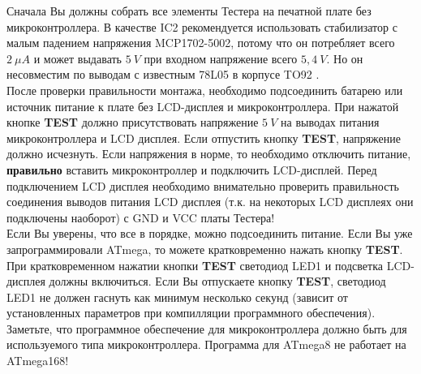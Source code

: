 Сначала Вы должны собрать все элементы Тестера на печатной плате без микроконтроллера. В качестве IC2 рекомендуется 
использовать стабилизатор с малым падением напряжения MCP1702-5002, потому что он потребляет всего  \(2~\mu A\) и может 
выдавать \(5~V\) при входном напряжение всего \(5,4~V\). Но он несовместим по выводам с известным 78L05 в корпусе TO92 .\\

После проверки правильности монтажа, необходимо подсоединить батарею или источник питание к плате без LCD-дисплея и 
микроконтроллера. При нажатой кнопке \textbf{ TEST} должно присутствовать напряжение \(5~V\) на выводах питания 
микроконтроллера и LCD дисплея. Если отпустить кнопку \textbf{ TEST}, напряжение должно исчезнуть. Если  напряжения 
в норме, то необходимо отключить питание, \textbf{ правильно} вставить микроконтроллер и подключить LCD-дисплей. 
Перед подключением LCD дисплея необходимо 
внимательно проверить правильность соединения выводов питания LCD дисплея (т.к. на некоторых LCD дисплеях они 
подключены наоборот) с GND и VCC платы Тестера!\\
 
Если Вы уверены, что все в порядке, можно подсоединить питание. Если Вы уже запрограммировали ATmega, то можете 
кратковременно нажать кнопку \textbf{ TEST}. При кратковременном нажатии кнопки \textbf{ TEST} светодиод LED1 и подсветка 
LCD-дисплея должны включиться. 
Если Вы отпускаете кнопку \textbf{ TEST}, светодиод LED1 не должен гаснуть как минимум несколько секунд 
(зависит от установленных параметров при компилляции программного обеспечения). 
Заметьте, что программное обеспечение для микроконтроллера должно быть для используемого типа микроконтроллера. Программа для ATmega8 не работает на ATmega168!



